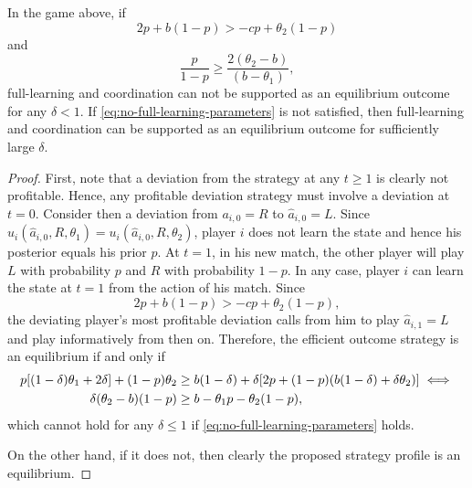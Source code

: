 \documentclass[12pt,letterpaper]{article}
\newtheorem{lemma}{\hskip\parindent\bf{Lemma}}
\begin{document}
\begin{lemma}
    In the game above, if \begin{equation}
        \label{eq:L-is-better}
        2p+b(1-p)>-cp+\theta_2(1-p)
    \end{equation} and \begin{equation}
        \label{eq:no-full-learning-parameters}
        \frac{p}{1-p}\geq \frac{2(\theta_2-b)}{(b-\theta_1)},
    \end{equation} full-learning and coordination can not be supported as an equilibrium outcome for any $\delta<1$. If \eqref{eq:no-full-learning-parameters} is not satisfied, then full-learning and coordination can be supported as an equilibrium outcome for sufficiently large $\delta$.

    \begin{proof}
        First, note that a deviation from the strategy at any $t\geq 1$ is clearly not profitable. Hence, any profitable deviation strategy must involve a deviation at $t=0$. Consider then a deviation from $a_{i,0}=R$ to $\hat{a}_{i,0}=L$. Since $u_i(\hat{a}_{i,0},R,\theta_1)=u_i(\hat{a}_{i,0},R,\theta_2)$, player $i$ does not learn the state and hence his posterior equals his prior $p$. At $t=1$, in his new match, the other player will play $L$ with probability $p$ and $R$ with probability $1-p$. In any case, player $i$ can learn the state at $t=1$ from the action of his match. Since $$2p+b(1-p)>-cp+\theta_2(1-p),$$ the deviating player's most profitable deviation calls from him to play $\hat{a}_{i,1}=L$ and play informatively from then on. Therefore, the efficient outcome strategy is an equilibrium if and only if \begin{align}
        \label{eq:all-learn-ic}
        p[(1-\delta)\theta_1+2\delta]+(1-p)\theta_2 &\geq b(1-\delta)+\delta[2p+(1-p)(b(1-\delta)+\delta \theta_2)]\iff \notag\\
        \delta (\theta_2-b)(1-p)&\geq b-\theta_1p-\theta_2(1-p), 
        \end{align} which cannot hold for any $\delta\leq 1$ if \eqref{eq:no-full-learning-parameters} holds.

        On the other hand, if it does not, then clearly the proposed strategy profile is an equilibrium.
        \end{proof}
\end{lemma}
\end{document}
